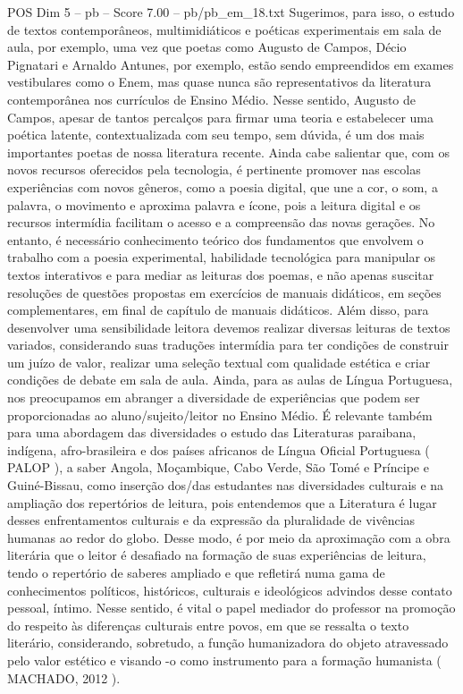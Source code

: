 \begin{textsample}{POS Dim 5 – pb – Score 7.00 – pb/pb\_em\_18.txt}
Sugerimos, para isso, o estudo de textos contemporâneos, multimidiáticos e poéticas experimentais em sala de aula, por exemplo, uma vez que poetas como Augusto de Campos, Décio Pignatari e Arnaldo Antunes, por exemplo, estão sendo empreendidos em exames vestibulares como o Enem, mas quase nunca são representativos da literatura contemporânea nos currículos de Ensino Médio.
Nesse sentido, Augusto de Campos, apesar de tantos percalços para firmar uma teoria e estabelecer uma poética latente, contextualizada com seu tempo, sem dúvida, é um dos mais importantes poetas de nossa literatura recente.
Ainda cabe salientar que, com os novos recursos oferecidos pela tecnologia, é pertinente promover nas escolas experiências com novos gêneros, como a poesia digital, que une a cor, o som, a palavra, o movimento e aproxima palavra e ícone, pois a leitura digital e os recursos intermídia facilitam o acesso e a compreensão das novas gerações.
No entanto, é necessário conhecimento teórico dos fundamentos que envolvem o trabalho com a poesia experimental, habilidade tecnológica para manipular os textos interativos e para mediar as leituras dos poemas, e não apenas suscitar resoluções de questões propostas em exercícios de manuais didáticos, em seções complementares, em final de capítulo de manuais didáticos.
Além disso, para desenvolver uma sensibilidade leitora devemos realizar diversas leituras de textos variados, considerando suas traduções intermídia para ter condições de construir um juízo de valor, realizar uma seleção textual com qualidade estética e criar condições de debate em sala de aula.
Ainda, para as aulas de Língua Portuguesa, nos preocupamos em abranger a diversidade de experiências que podem ser proporcionadas ao aluno/sujeito/leitor no Ensino Médio.
É relevante também para uma abordagem das diversidades o estudo das Literaturas paraibana, indígena, afro-brasileira e dos países africanos de Língua Oficial Portuguesa ( PALOP ), a saber Angola, Moçambique, Cabo Verde, São Tomé e Príncipe e Guiné-Bissau, como inserção dos/das estudantes nas diversidades culturais e na ampliação dos repertórios de leitura, pois entendemos que a Literatura é lugar desses enfrentamentos culturais e da expressão da pluralidade de vivências humanas ao redor do globo.
Desse modo, é por meio da aproximação com a obra literária que o leitor é desafiado na formação de suas experiências de leitura, tendo o repertório de saberes ampliado e que refletirá numa gama de conhecimentos políticos, históricos, culturais e ideológicos advindos desse contato pessoal, íntimo.
Nesse sentido, é vital o papel mediador do professor na promoção do respeito às diferenças culturais entre povos, em que se ressalta o texto literário, considerando, sobretudo, a função humanizadora do objeto atravessado pelo valor estético e visando -o como instrumento para a formação humanista ( MACHADO, 2012 ).

\end{textsample}
